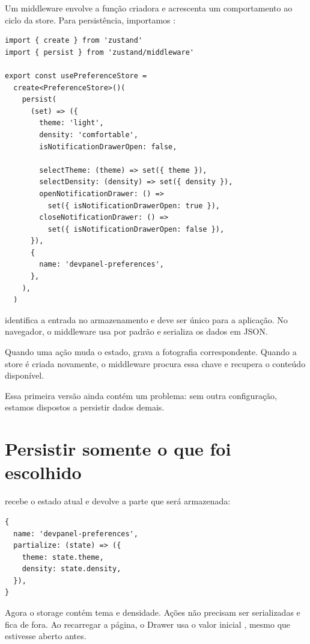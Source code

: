 Um middleware envolve a função criadora e acrescenta um comportamento ao ciclo
da store. Para persistência, importamos :

\begin{lstlisting}[caption={Store de preferências persistida.},label={lst:preference-persist}]
import { create } from 'zustand'
import { persist } from 'zustand/middleware'

export const usePreferenceStore =
  create<PreferenceStore>()(
    persist(
      (set) => ({
        theme: 'light',
        density: 'comfortable',
        isNotificationDrawerOpen: false,

        selectTheme: (theme) => set({ theme }),
        selectDensity: (density) => set({ density }),
        openNotificationDrawer: () =>
          set({ isNotificationDrawerOpen: true }),
        closeNotificationDrawer: () =>
          set({ isNotificationDrawerOpen: false }),
      }),
      {
        name: 'devpanel-preferences',
      },
    ),
  )
\end{lstlisting}

 identifica a entrada no armazenamento e deve ser único para a
aplicação. No navegador, o middleware usa  por padrão e
serializa os dados em JSON.

Quando uma ação muda o estado,  grava a fotografia correspondente.
Quando a store é criada novamente, o middleware procura essa chave e recupera o
conteúdo disponível.

Essa primeira versão ainda contém um problema: sem outra configuração, estamos
dispostos a persistir dados demais.

\section{Persistir somente o que foi escolhido}

 recebe o estado atual e devolve a parte que será armazenada:

\begin{lstlisting}[caption={Lista explícita das preferências persistidas.},label={lst:preference-partialize}]
{
  name: 'devpanel-preferences',
  partialize: (state) => ({
    theme: state.theme,
    density: state.density,
  }),
}
\end{lstlisting}

Agora o storage contém tema e densidade. Ações não precisam ser serializadas e
 fica de fora. Ao recarregar a página, o Drawer
usa o valor inicial , mesmo que estivesse aberto antes.

